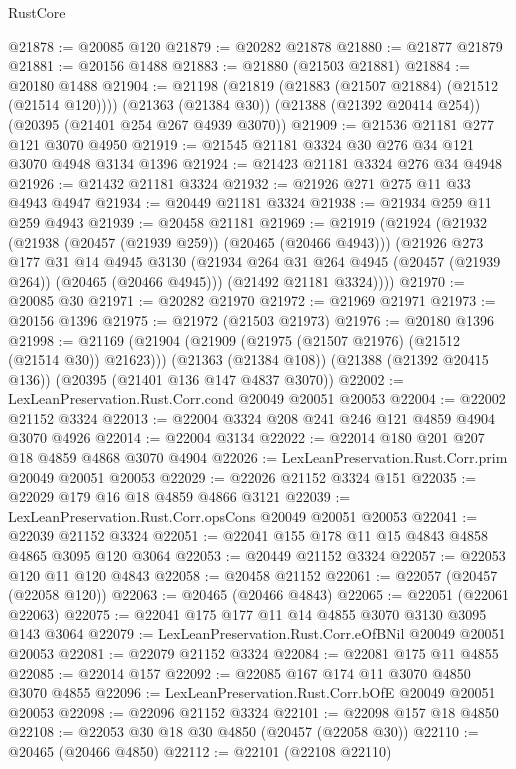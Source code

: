 \begin{lexlean}{RustCore}
\begin{coremodule}
@21878 := @20085 @120
@21879 := @20282 @21878
@21880 := @21877 @21879
@21881 := @20156 @1488
@21883 := @21880 (@21503 @21881)
@21884 := @20180 @1488
@21904 := @21198
    (@21819 (@21883 (@21507 @21884) (@21512 (@21514 @120))))
    (@21363 (@21384 @30))
    (@21388 (@21392 @20414 @254))
    (@20395 (@21401 @254 @267 @4939 @3070))
@21909 := @21536 @21181 @277 @121 @3070 @4950
@21919 := @21545 @21181 @3324 @30 @276 @34 @121 @3070 @4948 @3134 @1396
@21924 := @21423 @21181 @3324 @276 @34 @4948
@21926 := @21432 @21181 @3324
@21932 := @21926 @271 @275 @11 @33 @4943 @4947
@21934 := @20449 @21181 @3324
@21938 := @21934 @259 @11 @259 @4943
@21939 := @20458 @21181
@21969 := @21919
    (@21924
      (@21932
        (@21938 (@20457 (@21939 @259)) (@20465 (@20466 @4943)))
        (@21926
          @273
          @177
          @31
          @14
          @4945
          @3130
          (@21934 @264 @31 @264 @4945 (@20457 (@21939 @264)) (@20465 (@20466 @4945)))
          (@21492 @21181 @3324))))
@21970 := @20085 @30
@21971 := @20282 @21970
@21972 := @21969 @21971
@21973 := @20156 @1396
@21975 := @21972 (@21503 @21973)
@21976 := @20180 @1396
@21998 := @21169
    (@21904 (@21909 (@21975 (@21507 @21976) (@21512 (@21514 @30)) @21623)))
    (@21363 (@21384 @108))
    (@21388 (@21392 @20415 @136))
    (@20395 (@21401 @136 @147 @4837 @3070))
@22002 := LexLeanPreservation.Rust.Corr.cond @20049 @20051 @20053
@22004 := @22002 @21152 @3324
@22013 := @22004 @3324 @208 @241 @246 @121 @4859 @4904 @3070 @4926
@22014 := @22004 @3134
@22022 := @22014 @180 @201 @207 @18 @4859 @4868 @3070 @4904
@22026 := LexLeanPreservation.Rust.Corr.prim @20049 @20051 @20053
@22029 := @22026 @21152 @3324 @151
@22035 := @22029 @179 @16 @18 @4859 @4866 @3121
@22039 := LexLeanPreservation.Rust.Corr.opsCons @20049 @20051 @20053
@22041 := @22039 @21152 @3324
@22051 := @22041 @155 @178 @11 @15 @4843 @4858 @4865 @3095 @120 @3064
@22053 := @20449 @21152 @3324
@22057 := @22053 @120 @11 @120 @4843
@22058 := @20458 @21152
@22061 := @22057 (@20457 (@22058 @120))
@22063 := @20465 (@20466 @4843)
@22065 := @22051 (@22061 @22063)
@22075 := @22041 @175 @177 @11 @14 @4855 @3070 @3130 @3095 @143 @3064
@22079 := LexLeanPreservation.Rust.Corr.eOfBNil @20049 @20051 @20053
@22081 := @22079 @21152 @3324
@22084 := @22081 @175 @11 @4855
@22085 := @22014 @157
@22092 := @22085 @167 @174 @11 @3070 @4850 @3070 @4855
@22096 := LexLeanPreservation.Rust.Corr.bOfE @20049 @20051 @20053
@22098 := @22096 @21152 @3324
@22101 := @22098 @157 @18 @4850
@22108 := @22053 @30 @18 @30 @4850 (@20457 (@22058 @30))
@22110 := @20465 (@20466 @4850)
@22112 := @22101 (@22108 @22110)

\end{coremodule}
\end{lexlean}
